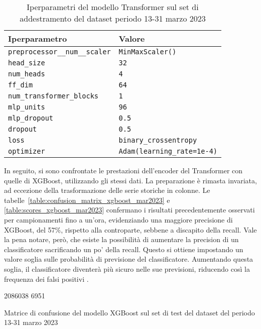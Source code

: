 \begin{table}[ht]
    \centering
    \begin{tabular}{ll}
        \toprule
        \textbf{Iperparametro} & \textbf{Valore} \\
        \midrule
        \texttt{preprocessor\_\_num\_\_scaler} & \texttt{MinMaxScaler()} \\
        \texttt{head\_size} & \texttt{32} \\
        \texttt{num\_heads} & \texttt{4} \\
        \texttt{ff\_dim} & \texttt{64} \\
        \texttt{num\_transformer\_blocks} & \texttt{1} \\
        \texttt{mlp\_units} & \texttt{96} \\
        \texttt{mlp\_dropout} & \texttt{0.5} \\
        \texttt{dropout} & \texttt{0.5} \\
        \texttt{loss} & \texttt{binary\_crossentropy} \\
        \texttt{optimizer} & \texttt{Adam(learning\_rate=1e-4)} \\
        \bottomrule
    \end{tabular}
    \caption{\small Iperparametri del modello Transformer sul set di
    addestramento del dataset periodo 13-31 marzo 2023}
    \label{table:transformer_hyperparams}
\end{table}

In seguito, si sono confrontate le prestazioni dell'encoder del Transformer
con quelle di XGBoost, utilizzando gli stessi dati. La preparazione è rimasta
invariata, ad eccezione della trasformazione delle serie storiche in colonne.
Le tabelle~\ref{table:confusion_matrix_xgboost_mar2023} e
\ref{table:scores_xgboost_mar2023} confermano i risultati precedentemente
osservati per campionamenti fino a un'ora, evidenziando una maggiore
precisione di XGBoost, del 57\%, rispetto alla controparte, sebbene a
discapito della recall. Vale la pena notare, però, che esiste la possibilità
di aumentare la precision di un classificatore sacrificando un po' della
recall. Questo si ottiene impostando un valore soglia sulle probabilità di
previsione del classificatore. Aumentando questa soglia, il classificatore
diventerà più sicuro nelle sue previsioni, riducendo così la frequenza dei
falsi positivi \cite{geron2019}.

\begin{table}[!ht]
    \centering 
    \confusionmatrix%
    {20860}{38}%
    {69}{51} 
    \caption{\small Matrice di confusione del modello XGBoost sul set di test
    del dataset del periodo 13-31 marzo 2023}
   \label{table:confusion_matrix_xgboost_mar2023}
\end{table}

